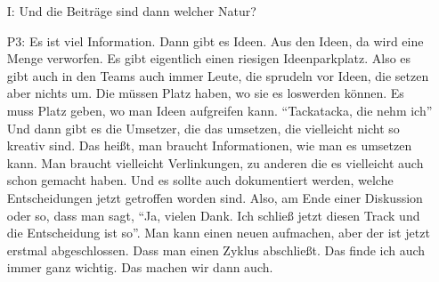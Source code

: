 \begin{itemize}
    \item[I:] Und die Beitr{\"a}ge sind dann welcher Natur?
    \item[P3:] Es ist viel Information. Dann gibt es Ideen. Aus den Ideen, da wird eine Menge verworfen. Es gibt eigentlich einen riesigen Ideenparkplatz. Also es gibt auch in den Teams auch immer Leute, die sprudeln vor Ideen, die setzen aber nichts um. Die m{\"u}ssen Platz haben, wo sie es loswerden k{\"o}nnen. Es muss Platz geben, wo man Ideen aufgreifen kann. "`Tackatacka, die nehm ich"' Und dann gibt es die Umsetzer, die das umsetzen, die vielleicht nicht so kreativ sind. Das hei{\ss}t, man braucht Informationen, wie man es umsetzen kann. Man braucht vielleicht Verlinkungen, zu anderen die es vielleicht auch schon gemacht haben. Und es sollte auch dokumentiert werden, welche Entscheidungen jetzt getroffen worden sind. Also, am Ende einer Diskussion oder so, dass man sagt, "`Ja, vielen Dank. Ich schlie{\ss} jetzt diesen Track und die Entscheidung ist so"'. Man kann einen neuen aufmachen, aber der ist jetzt erstmal abgeschlossen. Dass man einen Zyklus abschlie{\ss}t. Das finde ich auch immer ganz wichtig. Das machen wir dann auch.
\end{itemize}

